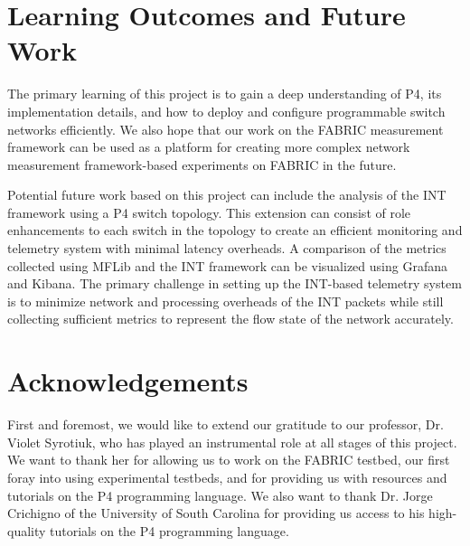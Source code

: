 \documentclass[conference]{IEEEtran}
\begin{document}
    \section{Learning Outcomes and Future Work}
    The primary learning of this project is to gain a deep understanding of P4, its implementation details, and how to deploy and configure programmable switch networks efficiently. We also hope that our work on the FABRIC measurement framework can be used as a platform for creating more complex network measurement framework-based experiments on FABRIC in the future.
        
    Potential future work based on this project can include the analysis of the INT framework using a P4 switch topology. This extension can consist of role enhancements to each switch in the topology to create an efficient monitoring and telemetry system with minimal latency overheads. A comparison of the metrics collected using MFLib and the INT framework can be visualized using Grafana and Kibana. The primary challenge in setting up the INT-based telemetry system is to minimize network and processing overheads of the INT packets while still collecting sufficient metrics to represent the flow state of the network accurately.

    \section{Acknowledgements}
    First and foremost, we would like to extend our gratitude to our professor, Dr. Violet Syrotiuk, who has played an instrumental role at all stages of this project. We want to thank her for allowing us to work on the FABRIC testbed, our first foray into using experimental testbeds, and for providing us with resources and tutorials on the P4 programming language. We also want to thank Dr. Jorge Crichigno of the University of South Carolina for providing us access to his high-quality tutorials on the P4 programming language.
\end{document}
